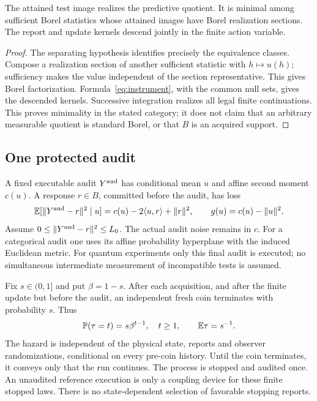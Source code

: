 \begin{lemma}\label{lem:quotient}
The attained test image realizes the predictive quotient. It is minimal among sufficient Borel statistics whose attained images have Borel realization sections. The report and update kernels descend jointly in the finite action variable.
\end{lemma}
\begin{proof}
The separating hypothesis identifies precisely the equivalence classes. Compose a realization section of another sufficient statistic with $h\mapsto u(h)$; sufficiency makes the value independent of the section representative. This gives Borel factorization. Formula~\eqref{eq:instrument}, with the common null sets, gives the descended kernels. Successive integration realizes all legal finite continuations. This proves minimality in the stated category; it does not claim that an arbitrary measurable quotient is standard Borel, or that $B$ is an acquired support.
\end{proof}

\subsection{One protected audit}
A fixed executable audit $Y^{\rm aud}$ has conditional mean $u$ and affine second moment $c(u)$. A response $r\in B$, committed before the audit, has loss
\begin{equation}\label{eq:loss}
 \mathbb E[\lVert Y^{\rm aud}-r\rVert^2\mid u]=c(u)-2\langle u,r\rangle+\lVert r\rVert^2,
 \qquad g(u)=c(u)-\lVert u\rVert^2.
\end{equation}
Assume $0\le\lVert Y^{\rm aud}-r\rVert^2\le L_0$. The actual audit noise remains in $c$. For a categorical audit one uses its affine probability hyperplane with the induced Euclidean metric. For quantum experiments only this final audit is executed; no simultaneous intermediate measurement of incompatible tests is assumed.

Fix $s\in(0,1]$ and put $\beta=1-s$. After each acquisition, and after the finite update but before the audit, an independent fresh coin terminates with probability $s$. Thus
\begin{equation}\label{eq:stop}
 \mathbb P(\tau=t)=s\beta^{t-1},\quad t\ge1,\qquad \mathbb E\tau=s^{-1}.
\end{equation}
The hazard is independent of the physical state, reports and observer randomizations, conditional on every pre-coin history. Until the coin terminates, it conveys only that the run continues. The process is stopped and audited once. An unaudited reference execution is only a coupling device for these finite stopped laws. There is no state-dependent selection of favorable stopping reports.

